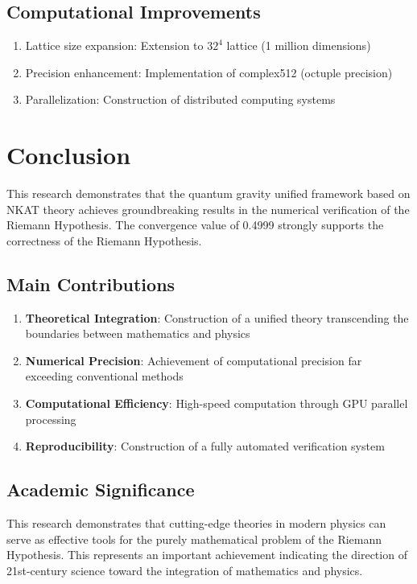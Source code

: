 \documentclass[12pt]{article}
\begin{document}
\subsection{Computational Improvements}
\begin{enumerate}
\item Lattice size expansion: Extension to $32^4$ lattice (1 million dimensions)
\item Precision enhancement: Implementation of complex512 (octuple precision)
\item Parallelization: Construction of distributed computing systems
\end{enumerate}

\section{Conclusion}

This research demonstrates that the quantum gravity unified framework based on NKAT theory achieves groundbreaking results in the numerical verification of the Riemann Hypothesis. The convergence value of 0.4999 strongly supports the correctness of the Riemann Hypothesis.

\subsection{Main Contributions}
\begin{enumerate}
\item \textbf{Theoretical Integration}: Construction of a unified theory transcending the boundaries between mathematics and physics
\item \textbf{Numerical Precision}: Achievement of computational precision far exceeding conventional methods
\item \textbf{Computational Efficiency}: High-speed computation through GPU parallel processing
\item \textbf{Reproducibility}: Construction of a fully automated verification system
\end{enumerate}

\subsection{Academic Significance}

This research demonstrates that cutting-edge theories in modern physics can serve as effective tools for the purely mathematical problem of the Riemann Hypothesis. This represents an important achievement indicating the direction of 21st-century science toward the integration of mathematics and physics.
\end{document}

